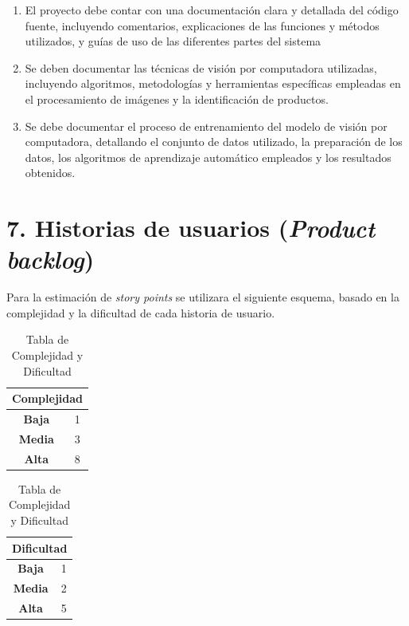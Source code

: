 \documentclass[
11pt, %
]{charter}
\begin{document}
\begin{enumerate}
\begin{enumerate}
			\item El proyecto debe contar con una documentación clara y detallada del código fuente, incluyendo comentarios, explicaciones de las funciones y métodos utilizados, y guías de uso de las diferentes partes del sistema
			\item Se deben documentar las técnicas de visión por computadora utilizadas, incluyendo algoritmos, metodologías y herramientas específicas empleadas en el procesamiento de imágenes y la identificación de productos.
			\item Se debe documentar el proceso de entrenamiento del modelo de visión por computadora, detallando el conjunto de datos utilizado, la preparación de los datos, los algoritmos de aprendizaje automático empleados y los resultados obtenidos.
		\end{enumerate}
\end{enumerate}

\section{7. Historias de usuarios (\textit{Product backlog})}
\label{sec:backlog}

Para la estimación de \textit{story points} se utilizara el siguiente esquema, basado en la complejidad y la dificultad de cada historia de usuario.

\begin{table}[ht]
\centering
\caption{Tabla de Complejidad y Dificultad}
\label{tab:tabla}
\begin{tabular}{|c|c|}
\hline
\multicolumn{2}{|c|}{\textbf{Complejidad}} \\ \hline
\textbf{Baja}   & 1                     \\ \hline
\textbf{Media} & 3                     \\ \hline
\textbf{Alta}  & 8                     \\ \hline
\end{tabular}
\quad
\begin{tabular}{|c|c|}
\hline
\multicolumn{2}{|c|}{\textbf{Dificultad}} \\ \hline
\textbf{Baja}   & 1                      \\ \hline
\textbf{Media} & 2                      \\ \hline
\textbf{Alta}  & 5                      \\ \hline
\end{tabular}
\end{table}
\end{document}
